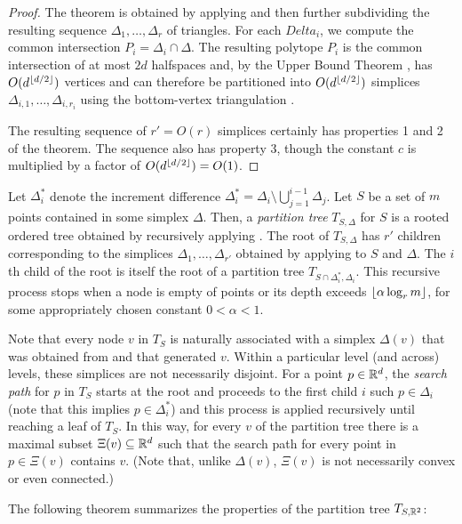 \documentclass{patmorin}
\begin{document}
\begin{proof}
The theorem is obtained by applying  and then
further subdividing the resulting sequence $\Delta_1,\ldots,\Delta_r$
of triangles.  For each $Delta_i$, we compute the common
intersection $P_i=\Delta_i \cap \Delta$. The resulting polytope $P_i$
is the common intersection of at most $2d$ halfspaces and, by the
Upper Bound Theorem \cite{X}, has $O(d^{{\left\lfloor d/2 \right\rfloor}})$ vertices
and can therefore be partitioned into $O(d^{{\left\lfloor d/2 \right\rfloor}})$ simplices
$\Delta_{i,1},\ldots,\Delta_{i,r_i}$ using the bottom-vertex triangulation
\cite{S}.

The resulting sequence of $r'=O(r)$ simplices certainly has properties 1
and 2 of the theorem.  The sequence also has property 3, though the
constant $c$ is multiplied by a factor of $O(d^{{\left\lfloor d/2 \right\rfloor}})=O(1)$.
\end{proof}

Let $\Delta_i^*$ denote the increment difference
$\Delta_i^*=\Delta_i\setminus\bigcup_{j=1}^{i-1}\Delta_j$.
Let $S$ be a set of $m$ points contained in some simplex
$\Delta$. Then, a \emph{partition tree} $T_{S,\Delta}$ for
$S$ is a rooted ordered tree obtained by recursively applying
.  The root of $T_{S,\Delta}$ has $r'$
children corresponding to the simplices $\Delta_1,\ldots,\Delta_{r'}$
obtained by applying  to $S$ and $\Delta$.
The $i$th child of the root is itself the root of a partition tree
$T_{S\cap\Delta_i^*,\Delta_i}$. This recursive process stops when a
node is empty of points or its depth exceeds ${\left\lfloor \alpha\log_r m \right\rfloor}$,
for some appropriately chosen constant $0< \alpha < 1$.

Note that every node $v$ in $T_S$ is naturally associated with a
simplex $\Delta(v)$ that was obtained from  and
that generated $v$. Within a particular level (and across) levels,
these simplices are not necessarily disjoint.  For a point $p\in\mathbb{R}^d$,
the \emph{search path} for $p$ in $T_S$ starts at the root and proceeds
to the first child $i$ such $p\in\Delta_i$ (note that this implies
$p\in\Delta_i^*$) and this process is applied recursively until reaching
a leaf of $T_S$.  In this way, for every $v$ of the partition tree there
is a maximal subset $\Xi(v)\subseteq \mathbb{R}^d$ such that the search path for
every point in $p\in\Xi(v)$ contains $v$.  (Note that, unlike $\Delta(v)$,
$\Xi(v)$ is not necessarily convex or even connected.)

The following theorem summarizes the properties of the partition tree
$T_{S,\mathbb{R}^2}$:
\end{document}

